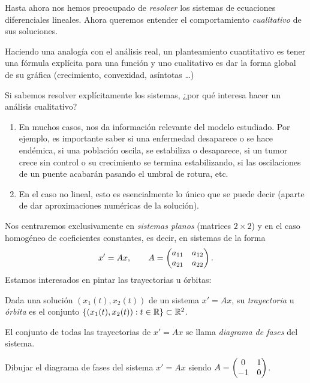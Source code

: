 \documentclass[../ecuaciones_diferenciales.tex]{subfiles}
\begin{document}
Hasta ahora nos hemos preocupado de \emph{resolver} los sistemas de ecuaciones
diferenciales lineales. Ahora queremos entender el comportamiento
\emph{cualitativo} de sus soluciones.

Haciendo una analogía con el análisis real, un planteamiento cuantitativo es
tener una fórmula explícita para una función y uno cualitativo es dar la forma
global de su gráfica (crecimiento, convexidad, asíntotas \ldots)

Si sabemos resolver explícitamente los sistemas, ¿por qué interesa hacer un
análisis cualitativo?

\begin{enumerate}[(1)]
	\item En muchos casos, nos da información relevante del modelo estudiado. Por
	      ejemplo, es importante saber si una enfermedad desaparece o se hace endémica,
	      si una población oscila, se estabiliza o desaparece, si un tumor crece sin
	      control o su crecimiento se termina estabilizando, si las oscilaciones de un
	      puente acabarán pasando el umbral de rotura, etc.

	\item En el caso no lineal, esto es esencialmente lo único que se puede decir
	      (aparte de dar aproximaciones numéricas de la solución).
\end{enumerate}

Nos centraremos exclusivamente en \emph{sistemas planos} (matrices \(2 \times 2\))
y en el caso homogéneo de coeficientes constantes, es decir, en sistemas de la
forma
\[x' = Ax, \qquad A = \begin{pmatrix}a_{11} & a_{12} \\ a_{21} & a_{22}\end{pmatrix}.\]
Estamos interesados en pintar las trayectorias u órbitas:

\begin{definition}[Trayectoria]
	Dada una solución \((x_1(t), x_2(t))\) de un sistema \(x' = Ax\), su
	\emph{trayectoria} u \emph{órbita} es el conjunto
	\(\{(x_1(t), x_2(t)) : t \in \mathbb{R}\} \subset \mathbb{R}^2\).
\end{definition}

\begin{definition}
	El conjunto de todas las trayectorias de \(x' = Ax\) se llama \emph{diagrama
		de fases} del sistema.
\end{definition}

\begin{example}\label{ex:fases_1}
	Dibujar el diagrama de fases del sistema \(x' = Ax\) siendo
	\(A = \begin{pmatrix}0 & 1 \\ -1 & 0\end{pmatrix}\).
\end{example}
\end{document}
